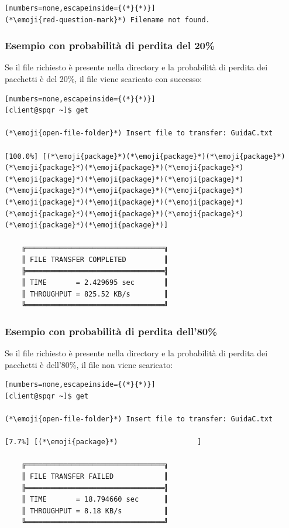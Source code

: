 \begin{lstlisting}[numbers=none,escapeinside={(*}{*)}]
(*\emoji{red-question-mark}*) Filename not found.
\end{lstlisting}

\subsubsection{Esempio con probabilità di perdita del 20\%}
Se il file richiesto è presente nella directory  e la probabilità di perdita dei pacchetti è del 20\%, il file viene scaricato con successo:

\begin{lstlisting}[numbers=none,escapeinside={(*}{*)}]
[client@spqr ~]$ get

(*\emoji{open-file-folder}*) Insert file to transfer: GuidaC.txt

[100.0%] [(*\emoji{package}*)(*\emoji{package}*)(*\emoji{package}*)(*\emoji{package}*)(*\emoji{package}*)(*\emoji{package}*)(*\emoji{package}*)(*\emoji{package}*)(*\emoji{package}*)(*\emoji{package}*)(*\emoji{package}*)(*\emoji{package}*)(*\emoji{package}*)(*\emoji{package}*)(*\emoji{package}*)(*\emoji{package}*)(*\emoji{package}*)(*\emoji{package}*)(*\emoji{package}*)(*\emoji{package}*)]

    ╔═════════════════════════════════╗
    ║ FILE TRANSFER COMPLETED         ║
    ╠═════════════════════════════════╣
    ║ TIME       = 2.429695 sec       ║
    ║ THROUGHPUT = 825.52 KB/s        ║
    ╚═════════════════════════════════╝    
\end{lstlisting}

\subsubsection{Esempio con probabilità di perdita dell'80\%}
Se il file richiesto è presente nella directory  e la probabilità di perdita dei pacchetti è dell'80\%, il file non viene scaricato:

\begin{lstlisting}[numbers=none,escapeinside={(*}{*)}]
[client@spqr ~]$ get

(*\emoji{open-file-folder}*) Insert file to transfer: GuidaC.txt

[7.7%] [(*\emoji{package}*)                   ]

    ╔═════════════════════════════════╗
    ║ FILE TRANSFER FAILED            ║
    ╠═════════════════════════════════╣
    ║ TIME       = 18.794660 sec      ║
    ║ THROUGHPUT = 8.18 KB/s          ║
    ╚═════════════════════════════════╝    
\end{lstlisting}



